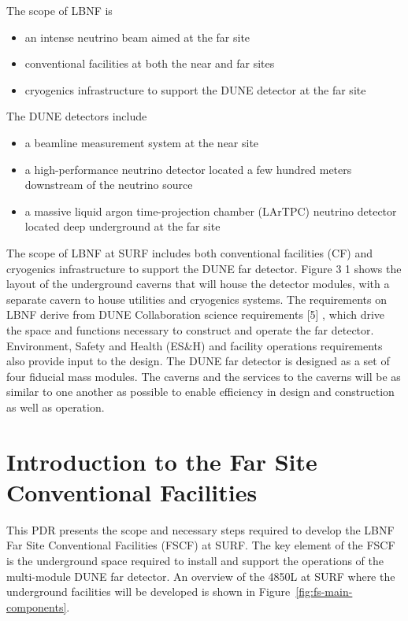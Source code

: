 The scope of LBNF is
\begin{itemize}
 \item an intense neutrino beam aimed at the far site
 \item conventional facilities at both the near and far sites
 \item cryogenics infrastructure to support the DUNE detector at the far site
\end{itemize}
The DUNE detectors include
\begin{itemize}
 \item a beamline measurement system at the near site 
\item a high-performance neutrino detector located a few hundred meters downstream of the neutrino source
 \item a massive liquid argon time-projection chamber (LArTPC) neutrino detector located deep underground at the far site
\end{itemize}

The scope of LBNF at SURF includes both conventional facilities (CF) and cryogenics infrastructure to support the DUNE far detector. Figure 3 1 \fixme{} shows the layout of the underground caverns that will house the detector modules, with a separate cavern to house utilities and cryogenics systems. The requirements on LBNF derive from DUNE Collaboration science requirements [5] \fixme{}, which drive the space and functions necessary to construct and operate the far detector.  Environment, Safety and Health (ES\&H) and facility operations requirements also provide input to the design. The DUNE far detector is designed as a set of four  fiducial mass modules. The caverns and the services to the caverns will be as similar to one another as possible to enable efficiency in design and construction as well as operation. 

\section{Introduction to the Far Site Conventional Facilities}
\label{sec:fs-facil-cf}


This PDR presents the scope and necessary steps required to develop the LBNF Far Site Conventional Facilities (FSCF) at SURF. The key element of the FSCF is the underground space required to install and support the operations of the multi-module DUNE far detector. An overview of the 4850L at SURF where the underground facilities will be developed is shown in Figure~\ref{fig:fs-main-components}.

